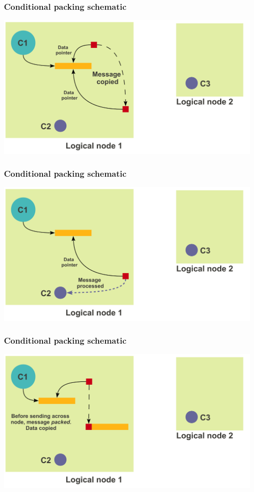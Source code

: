 \begin{frame}[fragile]
  \frametitle{Conditional packing schematic}
  \includegraphics[width=\textwidth]{figures/advancedOpts/fig2_1}
\end{frame}

\begin{frame}[fragile]
  \frametitle{Conditional packing schematic}
  \includegraphics[width=\textwidth]{figures/advancedOpts/fig2_2}
\end{frame}

\begin{frame}[fragile]
  \frametitle{Conditional packing schematic}
  \includegraphics[width=\textwidth]{figures/advancedOpts/fig3}
\end{frame}

